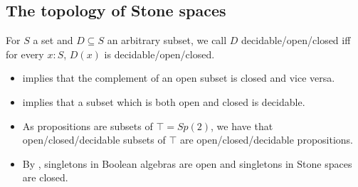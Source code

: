 \subsection{The topology of Stone spaces}
\begin{definition}
  For $S$ a set and $D\subseteq S$ an arbitrary subset, we call $D$ decidable/open/closed 
  iff for every $x:S$, $D(x)$ is decidable/open/closed. 
\end{definition}
\begin{remark}
  \begin{itemize}
    \item   {} implies that the complement of an 
  open subset is closed and vice versa. 
  \item 
     implies that a subset which is both open 
    and closed is decidable. 
  \item 
    As propositions are subsets of $\top = Sp(2)$, 
    we have that open/closed/decidable subsets of $\top$
    are open/closed/decidable propositions. 
  \item By , singletons in 
    Boolean algebras are open and singletons in Stone spaces are closed. 
\end{itemize}
\end{remark}


